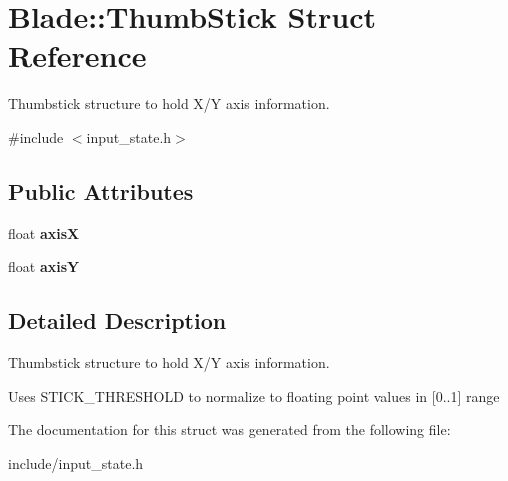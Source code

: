 \hypertarget{struct_blade_1_1_thumb_stick}{}\section{Blade\+:\+:Thumb\+Stick Struct Reference}
\label{struct_blade_1_1_thumb_stick}


Thumbstick structure to hold X/Y axis information.  




{\ttfamily \#include $<$input\+\_\+state.\+h$>$}

\subsection*{Public Attributes}
\begin{DoxyCompactItemize}
\item 
\mbox{\label{struct_blade_1_1_thumb_stick_a794e6ce2acd17cdd5140f5dc771d6943}} 
float {\bfseries axisX}
\item 
\mbox{\label{struct_blade_1_1_thumb_stick_ae7a0995b39eabc63d6fd5797279581ca}} 
float {\bfseries axisY}
\end{DoxyCompactItemize}


\subsection{Detailed Description}
Thumbstick structure to hold X/Y axis information. 

Uses S\+T\+I\+C\+K\+\_\+\+T\+H\+R\+E\+S\+H\+O\+LD to normalize to floating point values in \mbox{[}0..1\mbox{]} range 

The documentation for this struct was generated from the following file\+:\begin{DoxyCompactItemize}
\item 
include/input\+\_\+state.\+h\end{DoxyCompactItemize}
